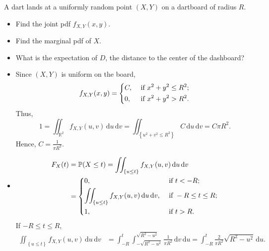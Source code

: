 \begin{eg}
    A dart lands at a uniformly random point \((X, Y)\) on a dartboard of radius \(R\). 
    \begin{itemize}
        \item [(a)] Find the joint pdf \(f_{X, Y}(x, y)\). 
        \item [(b)] Find the marginal pdf of \(X\).
        \item [(c)] What is the expectation of \(D\), the distance to the center of the dashboard?   
    \end{itemize}  
\end{eg}

\begin{explanation}
    \hfill 
    \begin{itemize}
        \item [(a)] Since \((X, Y)\) is uniform on the board, 
        \[
            f_{X, Y}(x, y) = \begin{dcases}
                C, &\text{ if } x^2 + y^2 \le R^2 ;\\
                0, &\text{ if } x^2 + y^2 > R^2.
            \end{dcases}
        \]
        Thus, 
        \[
            1 = \iint_{\mathbb{R} ^2} f_{X, Y}(u, v) \, \mathrm{d} u \, \mathrm{d} v = \iint_{\left\{ u^2 + v^2 \le R^2 \right\} } C \, \mathrm{d} u \, \mathrm{d} v = C \pi R^2.    
        \]
        Hence, \(C = \frac{1}{\pi R^2}\).
        \item [(b)] 
        \begin{align*}
            F_X(t) &= \mathbb{P} (X \le t) = \iint_{\left\{ u \le t \right\} } f_{X, Y}(u, v) \, \mathrm{d} u \, \mathrm{d} v \\
            &= \begin{dcases}
                0, &\text{ if } t < -R ;\\
                \iint_{\left\{ u \le t \right\} } f_{X, Y}(u, v) \, \mathrm{d} u \, \mathrm{d} v, &\text{ if } -R \le t \le R ;\\
                1, &\text{ if } t > R .
            \end{dcases}  
        \end{align*}
        If \(-R \le t \le R\), 
        \begin{align*}
            \iint_{\left\{ u \le t \right\} } f_{X, Y}(u, v) \, \mathrm{d} u \, \mathrm{d} v &= \int _{-R}^t \int _{- \sqrt{R^2 - u^2}}^{\sqrt{R^2 - u^2}} \frac{1}{\pi R^2} \, \mathrm{d} v \, \mathrm{d} u = \int _{-R}^t \frac{2}{\pi R^2} \sqrt{R^2 - u^2} \, \mathrm{d} u.    

\end{align*}
\end{itemize}
\end{explanation}
